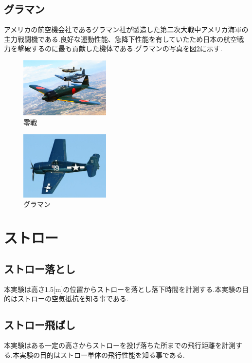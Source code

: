 \documentclass[twocolumn,11pt]{abst}
\begin{document}
\subsection{グラマン}
アメリカの航空機会社であるグラマン社が製造した第二次大戦中アメリカ海軍の主力戦闘機である.良好な運動性能、急降下性能を有していたため日本の航空戦力を撃破するのに最も貢献した機体である.グラマンの写真を図\ref{fig:guraman}に示す.

\begin{figure}[htbp]
  \begin{center}
    \includegraphics[width=45mm]{zerosen.jpg}
    \end{center}
  \caption{零戦}
 \label{fig:zerosen}
\end{figure}

\begin{figure}[htbp]
  \begin{center}
    \includegraphics[width=45mm]{guraman.jpg}
    \end{center}
  \caption{グラマン}
 \label{fig:guraman}
\end{figure}

\section{ストロー}

\subsection{ストロー落とし}
本実験は高さ1.5[m]の位置からストローを落とし落下時間を計測する.本実験の目的はストローの空気抵抗を知る事である.

\subsection{ストロー飛ばし}
本実験はある一定の高さからストローを投げ落ちた所までの飛行距離を計測する.本実験の目的はストロー単体の飛行性能を知る事である.
\end{document}
